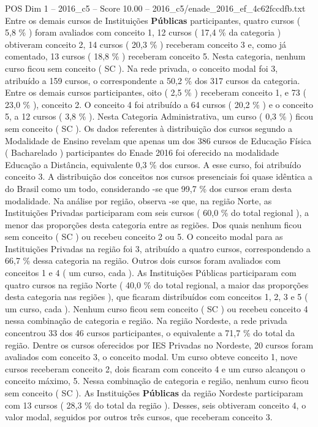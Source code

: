 \begin{textsample}{POS Dim 1 – 2016\_c5 – Score 10.00 – 2016\_c5/enade\_2016\_ef\_4c62fccdfb.txt}
Entre os demais cursos de Instituições \textbf{Públicas} participantes, quatro cursos ( 5,8 \% ) foram avaliados com conceito 1, 12 cursos ( 17,4 \% da categoria ) obtiveram conceito 2, 14 cursos ( 20,3 \% ) receberam conceito 3 e, como já comentado, 13 cursos ( 18,8 \% ) receberam conceito 5.
Nesta categoria, nenhum curso ficou sem conceito ( SC ).
Na rede privada, o conceito modal foi 3, atribuído a 159 cursos, o correspondente a 50,2 \% dos 317 cursos da categoria.
Entre os demais cursos participantes, oito ( 2,5 \% ) receberam conceito 1, e 73 ( 23,0 \% ), conceito 2.
O conceito 4 foi atribuído a 64 cursos ( 20,2 \% ) e o conceito 5, a 12 cursos ( 3,8 \% ).
Nesta Categoria Administrativa, um curso ( 0,3 \% ) ficou sem conceito ( SC ).
Os dados referentes à distribuição dos cursos segundo a Modalidade de Ensino revelam que apenas um dos 386 cursos de Educação Física ( Bacharelado ) participantes do Enade 2016 foi oferecido na modalidade Educação a Distância, equivalente 0,3 \% dos cursos.
A esse curso, foi atribuído conceito 3.
A distribuição dos conceitos nos cursos presenciais foi quase idêntica a do Brasil como um todo, considerando -se que 99,7 \% dos cursos eram desta modalidade.
Na análise por região, observa -se que, na região Norte, as Instituições Privadas participaram com seis cursos ( 60,0 \% do total regional ), a menor das proporções desta categoria entre as regiões.
Dos quais nenhum ficou sem conceito ( SC ) ou recebeu conceito 2 ou 5.
O conceito modal para as Instituições Privadas na região foi 3, atribuído a quatro cursos, correspondendo a 66,7 \% dessa categoria na região.
Outros dois cursos foram avaliados com conceitos 1 e 4 ( um curso, cada ).
As Instituições Públicas participaram com quatro cursos na região Norte ( 40,0 \% do total regional, a maior das proporções desta categoria nas regiões ), que ficaram distribuídos com conceitos 1, 2, 3 e 5 ( um curso, cada ).
Nenhum curso ficou sem conceito ( SC ) ou recebeu conceito 4 nessa combinação de categoria e região.
Na região Nordeste, a rede privada concentrou 33 dos 46 cursos participantes, o equivalente a 71,7 \% do total da região.
Dentre os cursos oferecidos por IES Privadas no Nordeste, 20 cursos foram avaliados com conceito 3, o conceito modal.
Um curso obteve conceito 1, nove cursos receberam conceito 2, dois ficaram com conceito 4 e um curso alcançou o conceito máximo, 5.
Nessa combinação de categoria e região, nenhum curso ficou sem conceito ( SC ).
As Instituições \textbf{Públicas} da região Nordeste participaram com 13 cursos ( 28,3 \% do total da região ).
Desses, seis obtiveram conceito 4, o valor modal, seguidos por outros três cursos, que receberam conceito 3.

\end{textsample}
